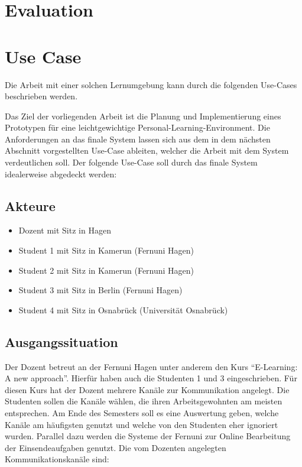 \section{Evaluation}

\section{Use Case}

Die Arbeit mit einer solchen Lernumgebung kann durch die folgenden Use-Cases beschrieben werden.

Das Ziel der vorliegenden Arbeit ist die Planung und Implementierung eines Prototypen für eine leichtgewichtige Personal-Learning-Environment. Die Anforderungen an das finale System lassen sich aus dem in dem nächsten Abschnitt vorgestellten Use-Case ableiten, welcher die Arbeit mit dem System verdeutlichen soll.
Der folgende Use-Case soll durch das finale System idealerweise abgedeckt werden:

\subsection{Akteure}

\begin{itemize}
 \item Dozent mit Sitz in Hagen
 \item Student 1 mit Sitz in Kamerun (Fernuni Hagen)
 \item Student 2 mit Sitz in Kamerun (Fernuni Hagen)
 \item Student 3 mit Sitz in Berlin (Fernuni Hagen)
 \item Student 4 mit Sitz in Osnabrück (Universität Osnabrück) 
\end{itemize}

\subsection{Ausgangssituation}\label{section:ausgangssituation}
Der Dozent betreut an der Fernuni Hagen unter anderem den Kurs "`E-Learning: A new approach"'. Hierfür haben auch die Studenten 1 und 3 eingeschrieben. Für diesen Kurs hat der Dozent mehrere Kanäle zur Kommunikation angelegt. Die Studenten sollen die Kanäle wählen, die ihren Arbeitsgewohnten am meisten entsprechen. Am Ende des Semesters soll es eine Auswertung geben, welche Kanäle am häufigsten genutzt und welche von den Studenten eher ignoriert wurden. Parallel dazu werden die Systeme der Fernuni zur Online Bearbeitung der Einsendeaufgaben genutzt. Die vom Dozenten angelegten Kommunikationskanäle sind:

